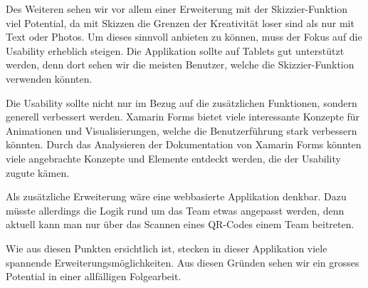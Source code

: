 Des Weiteren sehen wir vor allem einer Erweiterung mit der Skizzier-Funktion viel Potential, da mit Skizzen die Grenzen der Kreativität loser sind als nur mit Text oder Photos. Um dieses sinnvoll anbieten zu können, muss der Fokus auf die Usability erheblich steigen. Die Applikation sollte auf Tablets gut unterstützt werden, denn dort sehen wir die meisten Benutzer, welche die Skizzier-Funktion verwenden könnten. 

Die Usability sollte nicht nur im Bezug auf die zusätzlichen Funktionen, sondern generell verbessert werden. Xamarin Forms bietet viele interessante Konzepte für Animationen und Visualisierungen, welche die Benutzerführung stark verbessern könnten. Durch das Analysieren der Dokumentation von Xamarin Forms könnten viele angebrachte Konzepte und Elemente entdeckt werden, die der Usability zugute kämen.

Als zusätzliche Erweiterung wäre eine webbasierte Applikation denkbar. Dazu müsste allerdings die Logik rund um das Team etwas angepasst werden, denn aktuell kann man nur über das Scannen eines QR-Codes einem Team beitreten.

Wie aus diesen Punkten ersichtlich ist, stecken in dieser Applikation viele spannende Erweiterungsmöglichkeiten. Aus diesen Gründen sehen wir ein grosses Potential in einer allfälligen Folgearbeit.
